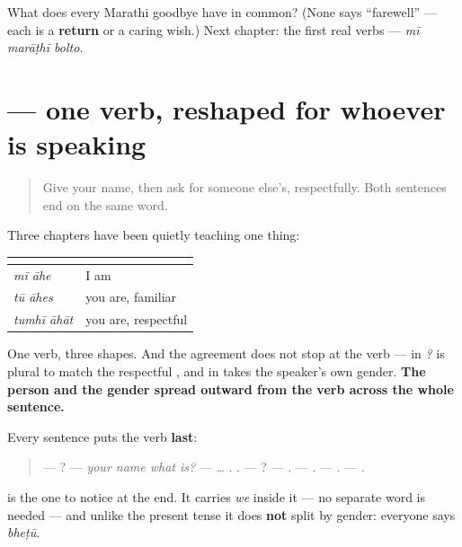 \begin{tcolorbox}[breakable,colback=teal!4,colframe=teal!35!black,title={Before you move on}]
What does every Marathi goodbye have in common? (None says \textquotedblleft{}farewell\textquotedblright{} — each is a \textbf{return} or a caring wish.) Next chapter: the first real verbs — \emph{mī marāṭhī bolto.}
\end{tcolorbox}
\section[\texorpdfstring{\mr{आहे} (āhe)}{आहे (āhe)}]{ — one verb, reshaped for whoever is speaking}

\label{lesson:MR-R11-second-pass-the-verb-carries-it}



\begin{quote}
Give your name, then ask for someone else's, respectfully. Both sentences end on the same word.
\end{quote}

\begin{grammarlens}[title={Grammar Lens: the verb carries the person}]
Three chapters have been quietly teaching one thing:

\noindent
\begin{tabularx}{\linewidth}{@{}>{\raggedright\arraybackslash}X>{\raggedright\arraybackslash}X@{}}
\toprule
\textbf{} & \textbf{} \\
\midrule
\textbf{\mr{मी} \mr{आहे}} \emph{mī āhe} & I am \\
\textbf{\mr{तू} \mr{आहेस}} \emph{tū āhes} & you are, familiar \\
\textbf{\mr{तुम्ही} \mr{आहात}} \emph{tumhī āhāt} & you are, respectful \\
\bottomrule
\end{tabularx}

One verb, three shapes. And the agreement does not stop at the verb — \textbf{} in \emph{  ?} is plural to match the respectful \emph{}, and \textbf{} in \emph{  } takes the speaker's own gender. \textbf{The person and the gender spread outward from the verb across the whole sentence.}
\end{grammarlens}

\begin{grammarlens}[title={What you've built — the first meeting, end to end}]
Every sentence puts the verb \textbf{last}:

\begin{quote}
—    ? — \emph{your name what is?} —   … .   . —   ? —   . — . —   . —  .
\end{quote}

\textbf{} is the one to notice at the end. It carries \emph{we} inside it — no separate word is needed — and unlike the present tense it does \textbf{not} split by gender: everyone says \emph{bheṭū}.
\end{grammarlens}

